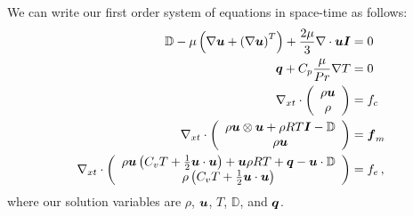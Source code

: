 \documentclass[Proposal.tex]{subfiles}
\begin{document}
We can write our first order system of equations in space-time as follows:
\begin{subequations}
\label{eq:compressibleNSFirstOrder}
\begin{align}
	\mathbb{D}-\mu\LRp{\Grad\bfu+\LRp{\Grad\bfu}^T}+\frac{2\mu}{3}\Div\bfu\bfI&=0\\
	\bfq+C_p\frac{\mu}{Pr}\Grad T&=0\\
	\Divxt\vecttwo{\rho\bfu}{\rho}&=f_c\\
	\Divxt\vecttwo{\rho\bfu\otimes\bfu+\rho RT\bfI-\mathbb{D}}{\rho\bfu}&=\bff_m\\
	\Divxt\vecttwo{\rho\bfu\LRp{C_v T+\frac{1}{2}\bfu\cdot\bfu}+\bfu\rho RT+\bfq-\bfu\cdot\mathbb{D}}{\rho\LRp{C_v T+\frac{1}{2}\bfu\cdot\bfu}}&=f_e\,,
\end{align}
\end{subequations}
where our solution variables are $\rho$, $\bfu$, $T$, $\mathbb{D}$, and $\bfq$.
\end{document}
